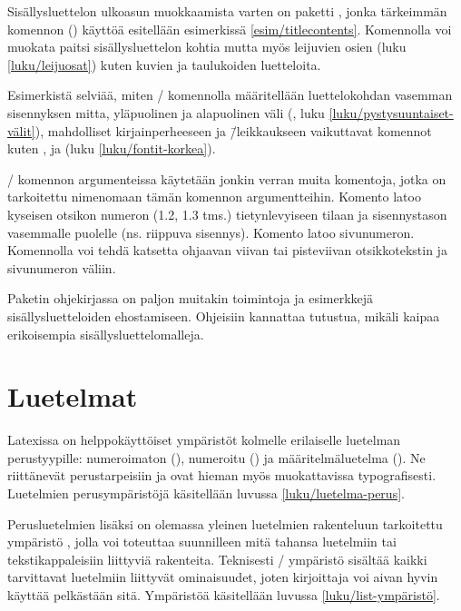 Sisällysluettelon ulkoasun muokkaamista varten on paketti
, jonka tärkeimmän komennon
() käyttöä esitellään esimerkissä
\ref{esim/titlecontents}. Komennolla voi muokata paitsi
sisällysluettelon kohtia mutta myös leijuvien osien (luku
\ref{luku/leijuosat}) kuten kuvien ja taulukoiden luetteloita.

Esimerkistä selviää, miten \-/ komennolla
määritellään luettelokohdan vasemman sisennyksen mitta, yläpuolinen ja
alapuolinen väli (, luku
\ref{luku/pystysuuntaiset-välit}), mahdolliset kirjainperheeseen ja
\=/leikkaukseen vaikuttavat komennot kuten ,
 ja  (luku \ref{luku/fontit-korkea}).

\-/ komennon argumenteissa käytetään jonkin
verran muita komentoja, jotka on tarkoitettu nimenomaan tämän komennon
argumentteihin. Komento  latoo kyseisen otsikon
numeron (1.2, 1.3 tms.) tietynlevyiseen tilaan ja sisennystason
vasemmalle puolelle (ns. riippuva sisennys). Komento
 latoo sivunumeron. Komennolla 
voi tehdä katsetta ohjaavan viivan tai pisteviivan otsikkotekstin ja
sivunumeron väliin.

Paketin  ohjekirjassa on paljon muitakin
toimintoja ja esimerkkejä sisällysluetteloiden ehostamiseen. Ohjeisiin
kannattaa tutustua, mikäli kaipaa erikoisempia sisällysluettelomalleja.

\section{Luetelmat}
\label{luku/luetelmat}

Latexissa on helppokäyttöiset ympäristöt kolmelle erilaiselle luetelman
perustyypille: numeroimaton (), numeroitu
() ja määritelmäluetelma ().
Ne riittänevät perustarpeisiin ja ovat hieman myös muokattavissa
typografisesti. Luetelmien perusympäristöjä käsitellään luvussa
\ref{luku/luetelma-perus}.

Perusluetelmien lisäksi on olemassa yleinen luetelmien rakenteluun
tarkoitettu ympäristö , jolla voi toteuttaa suunnilleen
mitä tahansa luetelmiin tai tekstikappaleisiin liittyviä rakenteita.
Teknisesti \-/ ympäristö sisältää kaikki tarvittavat
luetelmiin liittyvät ominaisuudet, joten kirjoittaja voi aivan hyvin
käyttää pelkästään sitä. Ympäristöä käsitellään luvussa
\ref{luku/list-ympäristö}.


